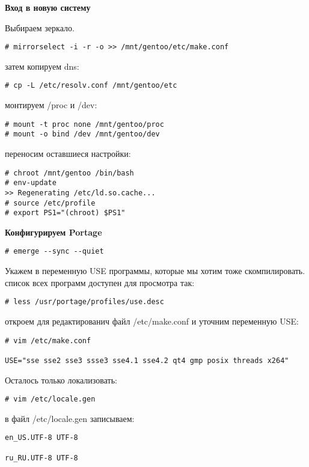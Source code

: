 \documentclass[10pt, a4paper]{article}
\begin{document}
{\bf Вход в новую систему}


Выбираем зеркало.

\begin{verbatim}
# mirrorselect -i -r -o >> /mnt/gentoo/etc/make.conf
\end{verbatim}

затем копируем dns:

\begin{verbatim}
# cp -L /etc/resolv.conf /mnt/gentoo/etc
\end{verbatim}

монтируем /proc и /dev:

\begin{verbatim}
# mount -t proc none /mnt/gentoo/proc
# mount -o bind /dev /mnt/gentoo/dev
\end{verbatim}

переносим оставшиеся настройки:

\begin{verbatim}
# chroot /mnt/gentoo /bin/bash
# env-update
>> Regenerating /etc/ld.so.cache...
# source /etc/profile
# export PS1="(chroot) $PS1"
\end{verbatim}

{\bf Конфигурируем Portage}

\begin{verbatim}
# emerge --sync --quiet
\end{verbatim}

Укажем в переменную USE программы, которые мы хотим тоже скомпилировать. список всех программ доступен для просмотра так:

\begin{verbatim}
# less /usr/portage/profiles/use.desc
\end{verbatim}

откроем для редактированич файл /etc/make.conf и уточним переменную USE:

\begin{verbatim}
# vim /etc/make.conf

USE="sse sse2 sse3 ssse3 sse4.1 sse4.2 qt4 gmp posix threads x264"
\end{verbatim}

Осталось только локализовать:

\begin{verbatim}
# vim /etc/locale.gen
\end{verbatim}

в файл /etc/locale.gen записываем:

\begin{verbatim}
en_US.UTF-8 UTF-8

ru_RU.UTF-8 UTF-8
\end{verbatim}
\end{document}
